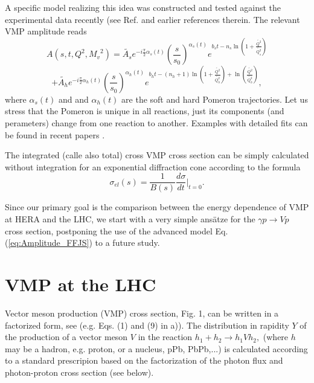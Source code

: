 \documentclass[12pt]{article}
\begin{document}
A specific model realizing this idea was constructed and tested against the experimental data recently (see
Ref. \cite{FFJS} and earlier references therein. The relevant VMP amplitude reads 
  $$
   A(s,t,Q^2,{M_v}^2)= \widetilde{A_s}e^{-i\frac{\pi}{2}\alpha_s(t)}\left(\frac{s}{s_{0}}\right)^{\alpha_s(t)}
    e^{b_st - n_s\ln{\left(1+\frac{\widetilde{Q^2}}{\widetilde{Q_s^2}}\right)}}
  $$
  \begin{equation}
  +\widetilde{A_h}e^{-i\frac{\pi}{2}\alpha_h(t)}\left(\frac{s}{s_{0}}\right)^{\alpha_h(t)}
    e^{b_ht - (n_h+1)\ln{\left(1+\frac{\widetilde{Q^2}}{\widetilde{Q_h^2}}\right)}
    +\ln{\left(\frac{\widetilde{Q^2}}{\widetilde{Q_h^2}}\right)} },
    \label{eq:Amplitude_FFJS}
    \end{equation}
 where  $\alpha_s(t)$ and and $\alpha_h(t)$ are the soft and hard Pomeron trajectories. Let us 
stress that the Pomeron is unique in all reactions, just its components (and perameters) change from one reaction
to another. Examples with detailed fits can be found in recent papers \cite{FFJS}.

The integrated (calle also total) cross VMP cross section can be simply calculated without integration for an exponential diffraction cone according to the formula
$$\sigma_{el}(s)=\frac{1}{B(s)}\frac{d\sigma}{dt}|_{t=0}.$$ 

Since our primary goal is the comparison between the energy dependence of VMP at HERA and the LHC, we start with a very simple ans\"atze for the $\gamma p\rightarrow Vp$ cross section, postponing the use of the advanced model  
Eq. (\ref{eq:Amplitude_FFJS}) to a future study.

\section{VMP at the LHC} 

Vector meson production (VMP) cross section, Fig. 1, can be written in a factorized form, see \cite{Brazil, Review} (e.g. Eqs. (1) and (9) in \cite{Brazil}a)).
The distribution in rapidity $Y$ of the production of a vector meson $V$ in the reaction $h_1+h_2\rightarrow h_1Vh_2,$ (where $h$ may be a hadron, e.g. proton, or a nucleus, pPb, PbPb,...) is calculated according to a standard prescripion based on the factorization of the photon flux and photon-proton cross section (see below).
\end{document}
